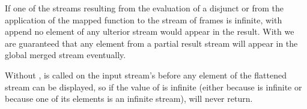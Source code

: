 \begin{exe}[4.72]
    If one of the streams resulting from the evaluation of a disjunct or from 
    the application of the mapped function to the stream of frames is infinite, 
    with append no element of any ulterior stream would appear in the result. 
    With  we are guaranteed that any element from a partial 
    result stream will appear in the global merged stream eventually.
\end{exe}

\begin{exe}[4.73]
    Without ,  is called on the input stream’s 
     before any element of the flattened stream can be displayed, so 
    if the value of  is infinite 
    (either because  is infinite or because one of its elements is 
    an infinite stream),  will never return.
\end{exe}
